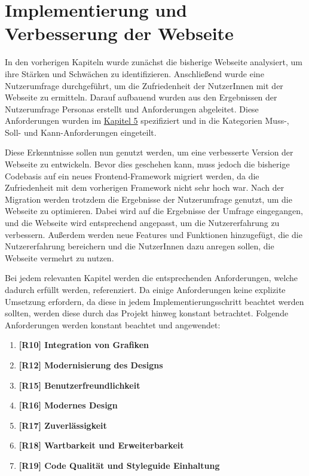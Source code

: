 
\chapter{Implementierung und Verbesserung der Webseite}
\label{chapter:6}

In den vorherigen Kapiteln wurde zunächst die bisherige Webseite analysiert, um ihre Stärken und Schwächen zu identifizieren. Anschließend wurde eine Nutzerumfrage durchgeführt, um die Zufriedenheit der NutzerInnen mit der Webseite zu ermitteln. Darauf aufbauend wurden aus den Ergebnissen der Nutzerumfrage Personas erstellt und Anforderungen abgeleitet. Diese Anforderungen wurden im \hyperref[chapter:5]{Kapitel 5} spezifiziert und in die Kategorien Muss-, Soll- und Kann-Anforderungen eingeteilt.

Diese Erkenntnisse sollen nun genutzt werden, um eine verbesserte Version der Webseite zu entwickeln. Bevor dies geschehen kann, muss jedoch die bisherige Codebasis auf ein neues Frontend-Framework migriert werden, da die Zufriedenheit mit dem vorherigen Framework nicht sehr hoch war. Nach der Migration werden trotzdem die Ergebnisse der Nutzerumfrage genutzt, um die Webseite zu optimieren. Dabei wird auf die Ergebnisse der Umfrage eingegangen, und die Webseite wird entsprechend angepasst, um die Nutzererfahrung zu verbessern. Außerdem werden neue Features und Funktionen hinzugefügt, die die Nutzererfahrung bereichern und die NutzerInnen dazu anregen sollen, die Webseite vermehrt zu nutzen.

Bei jedem relevanten Kapitel werden die entsprechenden Anforderungen, welche dadurch erfüllt werden, referenziert. Da einige Anforderungen keine explizite Umsetzung erfordern, da diese in jedem Implementierungsschritt beachtet werden sollten, werden diese durch das Projekt hinweg konstant betrachtet. Folgende Anforderungen werden konstant beachtet und angewendet:

\begin{enumerate}
    \item \textbf{[R10] Integration von Grafiken}
    \item \textbf{[R12] Modernisierung des Designs}
    \item \textbf{[R15] Benutzerfreundlichkeit}
    \item \textbf{[R16] Modernes Design}
    \item \textbf{[R17] Zuverlässigkeit}
    \item \textbf{[R18] Wartbarkeit und Erweiterbarkeit}
    \item \textbf{[R19] Code Qualität und Styleguide Einhaltung}
\end{enumerate}

